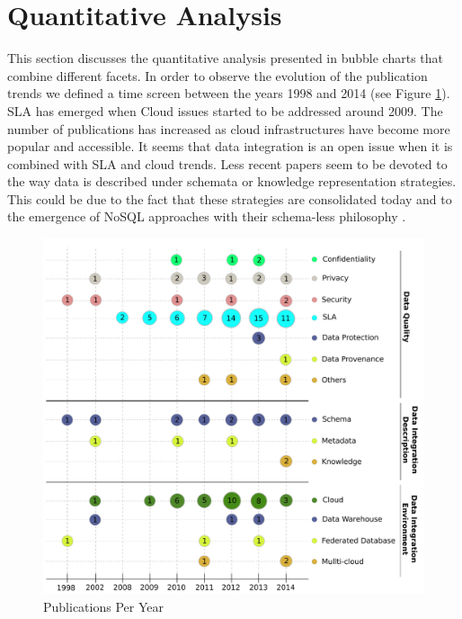 
\section{Quantitative Analysis}\label{sec:qanalysis}

This section discusses the quantitative analysis  presented in bubble charts that combine different facets. 
In order to observe the evolution of the publication trends we defined a time screen between the years 1998 and 2014 (see Figure \ref{fig:pubperyear}). SLA has emerged when Cloud issues started to be addressed around 2009. The number of publications has increased as cloud infrastructures have become more popular and accessible. It seems  that data integration is an open issue when it is combined with SLA and cloud trends. Less recent papers seem to be devoted to the way data is described under schemata or knowledge representation strategies. This could be due to the fact that these strategies are consolidated today and  to the emergence of NoSQL approaches with their schema-less philosophy \cite{sadalage2012nosql}. 

\begin{figure}[ht!]
\centering
\includegraphics[scale=0.33]{figs/bubble-charts/PublicationsPerYear.pdf} 
\caption{Publications Per Year}\label{fig:pubperyear}
\end{figure}

